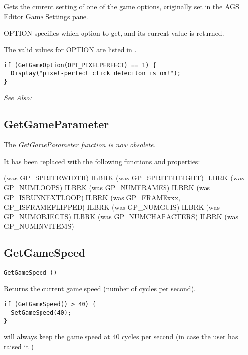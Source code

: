 Gets the current setting of one of the game options, originally set in the AGS Editor
Game Settings pane.

OPTION specifies which option to get, and its current value is returned.

The valid values for OPTION are listed in .

\begin{verbatim}
if (GetGameOption(OPT_PIXELPERFECT) == 1) {
  Display("pixel-perfect click deteciton is on!");
}
\end{verbatim}

\it{See Also:} 



\subsection{GetGameParameter}\label{GetGameParameter}%

The \it{GetGameParameter} function is now obsolete.

It has been replaced with the following functions and properties:

 (was GP_SPRITEWIDTH) ILBRK
 (was GP_SPRITEHEIGHT) ILBRK
 (was GP_NUMLOOPS) ILBRK
 (was GP_NUMFRAMES) ILBRK
 (was GP_ISRUNNEXTLOOP) ILBRK
 (was GP_FRAMExxx, GP_ISFRAMEFLIPPED) ILBRK
 (was GP_NUMGUIS) ILBRK
 (was GP_NUMOBJECTS) ILBRK
 (was GP_NUMCHARACTERS) ILBRK
(was GP_NUMINVITEMS)


\subsection{GetGameSpeed}\label{GetGameSpeed}%

\begin{verbatim}
GetGameSpeed ()
\end{verbatim}
Returns the current game speed (number of cycles per second).

\begin{verbatim}
if (GetGameSpeed() > 40) {
  SetGameSpeed(40);
}
\end{verbatim}
will always keep the game speed at 40 cycles per second (in case the user has raised it )

